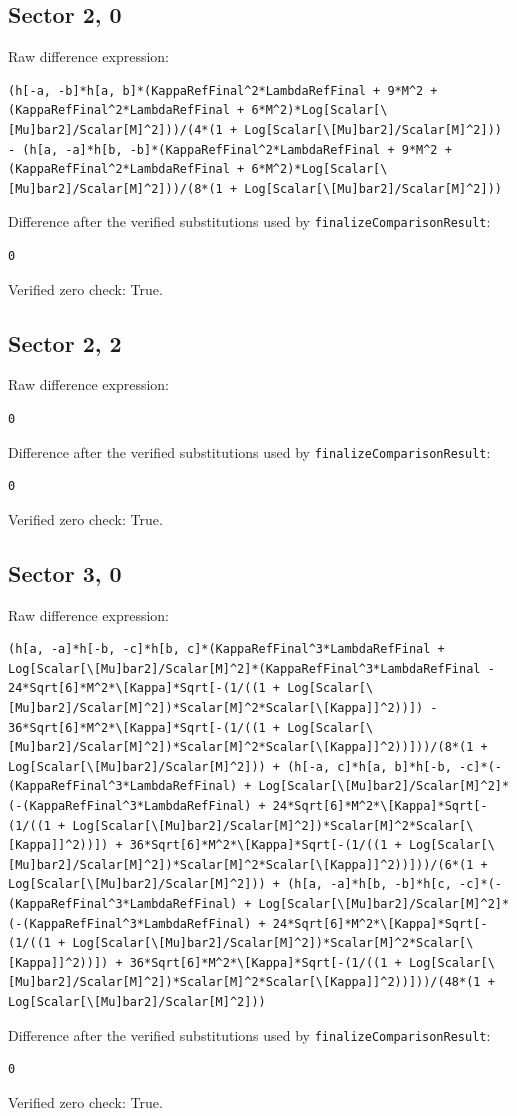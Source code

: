 \documentclass[11pt]{article}
\begin{document}
\subsection*{Sector {2, 0}}
Raw difference expression:
\begin{verbatim}
(h[-a, -b]*h[a, b]*(KappaRefFinal^2*LambdaRefFinal + 9*M^2 + (KappaRefFinal^2*LambdaRefFinal + 6*M^2)*Log[Scalar[\[Mu]bar2]/Scalar[M]^2]))/(4*(1 + Log[Scalar[\[Mu]bar2]/Scalar[M]^2])) - (h[a, -a]*h[b, -b]*(KappaRefFinal^2*LambdaRefFinal + 9*M^2 + (KappaRefFinal^2*LambdaRefFinal + 6*M^2)*Log[Scalar[\[Mu]bar2]/Scalar[M]^2]))/(8*(1 + Log[Scalar[\[Mu]bar2]/Scalar[M]^2]))
\end{verbatim}
Difference after the verified substitutions used by \texttt{finalizeComparisonResult}:
\begin{verbatim}
0
\end{verbatim}
Verified zero check: True.

\subsection*{Sector {2, 2}}
Raw difference expression:
\begin{verbatim}
0
\end{verbatim}
Difference after the verified substitutions used by \texttt{finalizeComparisonResult}:
\begin{verbatim}
0
\end{verbatim}
Verified zero check: True.

\subsection*{Sector {3, 0}}
Raw difference expression:
\begin{verbatim}
(h[a, -a]*h[-b, -c]*h[b, c]*(KappaRefFinal^3*LambdaRefFinal + Log[Scalar[\[Mu]bar2]/Scalar[M]^2]*(KappaRefFinal^3*LambdaRefFinal - 24*Sqrt[6]*M^2*\[Kappa]*Sqrt[-(1/((1 + Log[Scalar[\[Mu]bar2]/Scalar[M]^2])*Scalar[M]^2*Scalar[\[Kappa]]^2))]) - 36*Sqrt[6]*M^2*\[Kappa]*Sqrt[-(1/((1 + Log[Scalar[\[Mu]bar2]/Scalar[M]^2])*Scalar[M]^2*Scalar[\[Kappa]]^2))]))/(8*(1 + Log[Scalar[\[Mu]bar2]/Scalar[M]^2])) + (h[-a, c]*h[a, b]*h[-b, -c]*(-(KappaRefFinal^3*LambdaRefFinal) + Log[Scalar[\[Mu]bar2]/Scalar[M]^2]*(-(KappaRefFinal^3*LambdaRefFinal) + 24*Sqrt[6]*M^2*\[Kappa]*Sqrt[-(1/((1 + Log[Scalar[\[Mu]bar2]/Scalar[M]^2])*Scalar[M]^2*Scalar[\[Kappa]]^2))]) + 36*Sqrt[6]*M^2*\[Kappa]*Sqrt[-(1/((1 + Log[Scalar[\[Mu]bar2]/Scalar[M]^2])*Scalar[M]^2*Scalar[\[Kappa]]^2))]))/(6*(1 + Log[Scalar[\[Mu]bar2]/Scalar[M]^2])) + (h[a, -a]*h[b, -b]*h[c, -c]*(-(KappaRefFinal^3*LambdaRefFinal) + Log[Scalar[\[Mu]bar2]/Scalar[M]^2]*(-(KappaRefFinal^3*LambdaRefFinal) + 24*Sqrt[6]*M^2*\[Kappa]*Sqrt[-(1/((1 + Log[Scalar[\[Mu]bar2]/Scalar[M]^2])*Scalar[M]^2*Scalar[\[Kappa]]^2))]) + 36*Sqrt[6]*M^2*\[Kappa]*Sqrt[-(1/((1 + Log[Scalar[\[Mu]bar2]/Scalar[M]^2])*Scalar[M]^2*Scalar[\[Kappa]]^2))]))/(48*(1 + Log[Scalar[\[Mu]bar2]/Scalar[M]^2]))
\end{verbatim}
Difference after the verified substitutions used by \texttt{finalizeComparisonResult}:
\begin{verbatim}
0
\end{verbatim}
Verified zero check: True.
\end{document}
